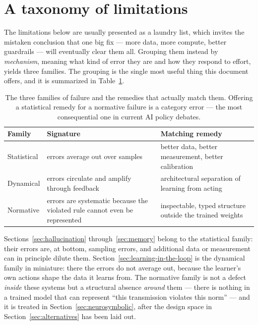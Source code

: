 \documentclass[11pt,a4paper]{article}
\begin{document}
\section{A taxonomy of limitations}
\label{sec:taxonomy}

The limitations below are usually presented as a laundry list, which invites
the mistaken conclusion that one big fix --- more data, more compute, better
guardrails --- will eventually clear them all. Grouping them instead by
\emph{mechanism}, meaning what kind of error they are and how they respond to
effort, yields three families. The grouping is the single most useful thing
this document offers, and it is summarized in Table~\ref{tab:trichotomy}.

\begin{table}[htbp]
\centering
\caption{The three families of failure and the remedies that actually match
them. Offering a statistical remedy for a normative failure is a category
error --- the most consequential one in current AI policy debates.}
\label{tab:trichotomy}
\begin{tabular}{@{}p{}p{}p{}@{}}
\toprule
\textbf{Family} & \textbf{Signature} & \textbf{Matching remedy} \\
\midrule
Statistical & errors average out over samples & better data, better
measurement, better calibration \\
Dynamical & errors circulate and amplify through feedback & architectural
separation of learning from acting \\
Normative & errors are systematic because the violated rule cannot even be
represented & inspectable, typed structure outside the trained weights \\
\bottomrule
\end{tabular}
\end{table}

Sections~\ref{sec:hallucination} through~\ref{sec:memory} belong to the
statistical family: their errors are, at bottom, sampling errors, and
additional data or measurement can in principle dilute them.
Section~\ref{sec:learning-in-the-loop} is the dynamical family in miniature:
there the errors do not average out, because the learner's own actions shape
the data it learns from. The normative family is not a defect
\emph{inside} these systems but a structural absence \emph{around} them ---
there is nothing in a trained model that can represent ``this transmission
violates this norm'' --- and it is treated in
Section~\ref{sec:neurosymbolic}, after the design space in
Section~\ref{sec:alternatives} has been laid out.
\end{document}
